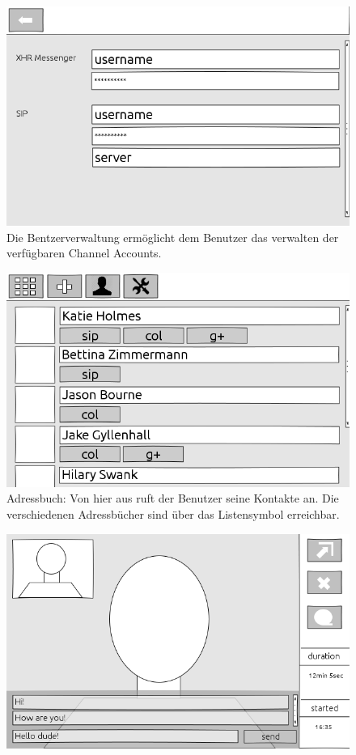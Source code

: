 \begin{landscape}
\begin{figure}[H]
		\includegraphics[height=0.6\textwidth]{../ui/img/uiDraft2/UserView-addChannel.png}
		\caption{Die Bentzerverwaltung ermöglicht dem Benutzer das verwalten der verfügbaren Channel Accounts.}
		\label{user management screen}
	\end{figure}
	\begin{figure}[H]
		\centering
		\includegraphics[height=0.6\textwidth]{../ui/img/uiDraft2/ContactbookView.png}
		\caption{Adressbuch: Von hier aus ruft der Benutzer seine Kontakte an. Die verschiedenen Adressbücher sind über das Listensymbol erreichbar.}
		\label{contactbook screen}
	\end{figure}
	\begin{figure}[H]
		\centering
		\includegraphics[height=0.6\textwidth]{../ui/img/uiDraft2/PhoneViewWithMessenger.png}

\end{figure}
\end{landscape}
